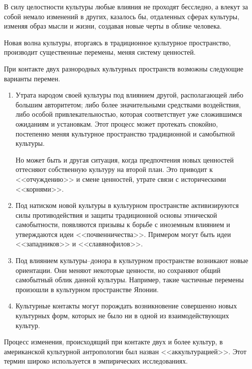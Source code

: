   В силу целостности культуры любые влияния не проходят бесследно, а влекут за
  собой немало изменений в других, казалось бы, отдаленных сферах культуры,
  изменяя образ мысли и жизни, создавая новые черты в облике человека.
  
  Новая волна культуры, вторгаясь в традиционное культурное пространство,
  производит существенные перемены, меняя систему ценностей.
  
  При контакте двух разнородных культурных пространств возможны следующие
  варианты перемен.
  
  \begin{enumerate}
    \item Утрата народом своей культуры под влиянием другой, располагающей либо
      большим авторитетом; либо более значительными средствами воздействия,
      либо особой привлекательностью, которая соответствует уже сложившимся
      ожиданиям и установкам. Этот процесс может протекать спокойно, постепенно
      меняя культурное пространство традиционной и самобытной культуры.
  
      Но может быть и другая ситуация, когда предпочтения новых ценностей
      оттесняют собственную культуру на второй план. Это приводит к
      <<отчуждению>> и смене ценностей, утрате связи с историческими
      <<корнями>>.
  
    \item Под натиском новой культуры в культурном пространстве активизируются
      силы противодействия и защиты традиционной основы этнической
      самобытности, появляются призывы к борьбе с иноземным влиянием и
      утверждаются идеи <<почвенничества>>. Примером могут быть идеи
      <<западников>> и <<славянофилов>>.
  
    \item Под влиянием культуры–донора в культурном пространстве возникают
      новые ориентации. Они меняют некоторые ценности, но сохраняют общий
      самобытный облик данной культуры. Например, такие частичные перемены
      произошли в культурном пространстве Японии.  
      
    \item Культурные контакты могут порождать возникновение совершенно новых
      культурных форм, которых не было ни в одной из взаимодействующих культур.
  \end{enumerate}
  
  Процесс изменения, происходящий при контакте двух и более культур, в
  американской культурной антропологии был назван <<аккультурацией>>. Этот
  термин широко используется в эмпирических исследованиях.
  
